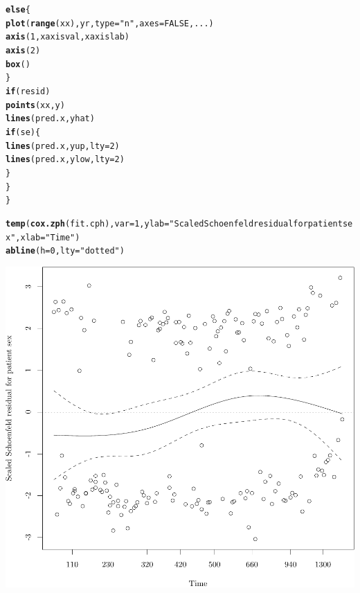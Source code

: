 \documentclass{article}\usepackage[]{graphicx}\usepackage[]{color}
\makeatletter
\def\maxwidth{ %
  \ifdim\Gin@nat@width>\linewidth
    \linewidth
  \else
    \Gin@nat@width
  \fi
}
\newcommand{\hlnum}[1]{\textcolor[rgb]{0.686,0.059,0.569}{#1}}%
\newcommand{\hlstr}[1]{\textcolor[rgb]{0.192,0.494,0.8}{#1}}%
\newcommand{\hlstd}[1]{\textcolor[rgb]{0.345,0.345,0.345}{#1}}%
\newcommand{\hlkwa}[1]{\textcolor[rgb]{0.161,0.373,0.58}{\textbf{#1}}}%
\newcommand{\hlkwc}[1]{\textcolor[rgb]{0.333,0.667,0.333}{#1}}%
\newcommand{\hlkwd}[1]{\textcolor[rgb]{0.737,0.353,0.396}{\textbf{#1}}}%
\newenvironment{kframe}{%
 \def\at@end@of@kframe{}%
 \ifinner\ifhmode%
  \def\at@end@of@kframe{\end{minipage}}%
  \begin{minipage}{\columnwidth}%
 \fi\fi%
 \def\FrameCommand##1{\hskip\@totalleftmargin \hskip-\fboxsep
 \colorbox{shadecolor}{##1}\hskip-\fboxsep
     \hskip-\linewidth \hskip-\@totalleftmargin \hskip\columnwidth}%
 \MakeFramed {\advance\hsize-\width
   \@totalleftmargin\z@ \linewidth\hsize
   \@setminipage}}%
 {\par\unskip\endMakeFramed%
 \at@end@of@kframe}
\newenvironment{knitrout}{}{} %
\makeatother
\begin{document}
\begin{knitrout}
\begin{kframe}
\begin{alltt}
        \hlkwa{else} \hlstd{\{}
            \hlkwd{plot}\hlstd{(}\hlkwd{range}\hlstd{(xx), yr,} \hlkwc{type} \hlstd{=} \hlstr{"n"}\hlstd{,} \hlkwc{axes} \hlstd{=} \hlnum{FALSE}\hlstd{, ...)}
            \hlkwd{axis}\hlstd{(}\hlnum{1}\hlstd{, xaxisval, xaxislab)}
            \hlkwd{axis}\hlstd{(}\hlnum{2}\hlstd{)}
            \hlkwd{box}\hlstd{()}
        \hlstd{\}}
        \hlkwa{if} \hlstd{(resid)}
            \hlkwd{points}\hlstd{(xx, y)}
        \hlkwd{lines}\hlstd{(pred.x, yhat)}
        \hlkwa{if} \hlstd{(se) \{}
            \hlkwd{lines}\hlstd{(pred.x, yup,} \hlkwc{lty} \hlstd{=} \hlnum{2}\hlstd{)}
            \hlkwd{lines}\hlstd{(pred.x, ylow,} \hlkwc{lty} \hlstd{=} \hlnum{2}\hlstd{)}
        \hlstd{\}}
    \hlstd{\}}
\hlstd{\}}

\hlkwd{temp}\hlstd{(}\hlkwd{cox.zph}\hlstd{(fit.cph),} \hlkwc{var} \hlstd{=} \hlnum{1}\hlstd{,} \hlkwc{ylab} \hlstd{=} \hlstr{"Scaled Schoenfeld residual for patient sex"}\hlstd{,} \hlkwc{xlab} \hlstd{=} \hlstr{"Time"}\hlstd{)}
\hlkwd{abline}\hlstd{(}\hlkwc{h} \hlstd{=} \hlnum{0}\hlstd{,} \hlkwc{lty} \hlstd{=} \hlstr{"dotted"}\hlstd{)}
\end{alltt}
\end{kframe}

{\centering \includegraphics[width=\maxwidth]{figure/05-eda-ph-check-full-sexplot-1} 

}



\end{knitrout}
\end{document}
